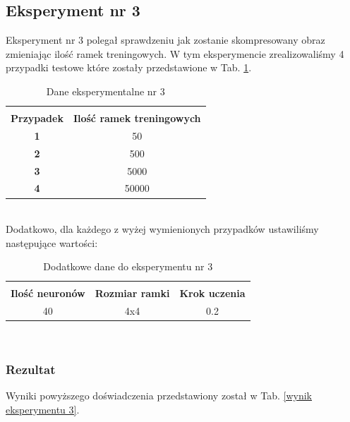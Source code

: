 \documentclass[12pt]{article}
\begin{document}
\subsection{Eksperyment nr 3}

Eksperyment nr 3 polegał sprawdzeniu jak zostanie skompresowany obraz zmieniając ilość ramek treningowych. W tym eksperymencie zrealizowaliśmy 4 przypadki testowe które zostały przedstawione w Tab.  
\ref{dane eksperymentalne doświadczenia 3}. \\
\begin{table}[h!]
 \caption{Dane eksperymentalne nr 3}
 \centering
 \vspace{0.2cm}
 \begin{tabular}{c c}
  \hline\hline\\[-0.4cm]
  \textbf{Przypadek} & \textbf{Ilość ramek treningowych} \\[0.1cm]
  \textbf{1} & 50  \\
  \textbf{2} & 500  \\
  \textbf{3} & 5000  \\ 
  \textbf{4} & 50000  \\  [0.1cm]
  \hline
 \end{tabular}
 \label{dane eksperymentalne doświadczenia 3}
\end{table} \\

Dodatkowo, dla każdego z wyżej wymienionych przypadków ustawiliśmy następujące wartości: \\
\begin{table}[h!]
 \caption{Dodatkowe dane do eksperymentu nr 3}
 \centering
 \vspace{0.2cm}
 \begin{tabular}{c c c}
  \hline\hline\\[-0.4cm]
  \textbf{Ilość neuronów} & \textbf{Rozmiar ramki} & \textbf{Krok uczenia} \\[0.1cm]
  40 & 4x4 & 0.2  \\ [0.1cm]
  \hline
 \end{tabular}
 \label{dodatkowe dane do eksperymentu nr 3}
\end{table} \\

\newpage
\subsubsection{Rezultat}

Wyniki powyższego doświadczenia przedstawiony został w Tab. 
\ref{wynik eksperymentu 3}.
\end{document}
